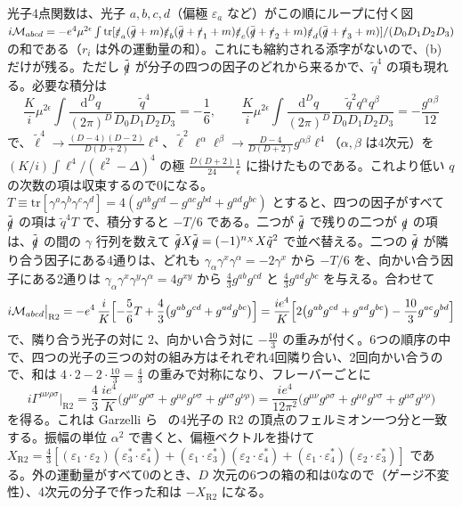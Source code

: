 \documentclass[a4paper,10pt]{ltjsarticle}
\newcommand{\dd}{\mathrm{d}}
\begin{document}
光子4点関数は、光子 $a,b,c,d$（偏極 $\varepsilon_a$ など）がこの順にループに付く図 $i\mathcal M_{abcd}=-e^4\mu^{2\epsilon}\int\mathrm{tr}[\slashed\varepsilon_a(\bar{\slashed q}+m)\slashed\varepsilon_b(\bar{\slashed q}+\slashed r_1+m)\slashed\varepsilon_c(\bar{\slashed q}+\slashed r_2+m)\slashed\varepsilon_d(\bar{\slashed q}+\slashed r_3+m)]/(D_0D_1D_2D_3)$ の和である（$r_i$ は外の運動量の和）。これにも縮約される添字がないので、(b) だけが残る。ただし $\tilde{\slashed q}$ が分子の四つの因子のどれから来るかで、$\tilde q^4$ の項も現れる。必要な積分は
\begin{equation*}
\frac Ki\mu^{2\epsilon}\int\frac{\dd^Dq}{(2\pi)^D}\frac{\tilde q^4}{D_0D_1D_2D_3}=-\frac16,\qquad
\frac Ki\mu^{2\epsilon}\int\frac{\dd^Dq}{(2\pi)^D}\frac{\tilde q^2q^\alpha q^\beta}{D_0D_1D_2D_3}=-\frac{g^{\alpha\beta}}{12}
\end{equation*}
で、$\tilde\ell^4\to\frac{(D-4)(D-2)}{D(D+2)}\ell^4$、$\tilde\ell^2\ell^\alpha\ell^\beta\to\frac{D-4}{D(D+2)}g^{\alpha\beta}\ell^4$（$\alpha,\beta$ は4次元）を $(K/i)\int\ell^4/(\ell^2-\Delta)^4$ の極 $\frac{D(D+2)}{24}\frac1\epsilon$ に掛けたものである。これより低い $q$ の次数の項は収束するので0になる。$T\equiv\mathrm{tr}[\gamma^a\gamma^b\gamma^c\gamma^d]=4(g^{ab}g^{cd}-g^{ac}g^{bd}+g^{ad}g^{bc})$ とすると、四つの因子がすべて $\tilde{\slashed q}$ の項は $\tilde q^4T$ で、積分すると $-T/6$ である。二つが $\tilde{\slashed q}$ で残りの二つが $\slashed q$ の項は、$\tilde{\slashed q}$ の間の $\gamma$ 行列を数えて $\tilde{\slashed q}X\tilde{\slashed q}=(-1)^{n_X}X\tilde q^2$ で並べ替える。二つの $\tilde{\slashed q}$ が隣り合う因子にある4通りは、どれも $\gamma_\alpha\gamma^x\gamma^\alpha=-2\gamma^x$ から $-T/6$ を、向かい合う因子にある2通りは $\gamma_\alpha\gamma^x\gamma^y\gamma^\alpha=4g^{xy}$ から $\frac43g^{ab}g^{cd}$ と $\frac43g^{ad}g^{bc}$ を与える。合わせて
\begin{equation*}
i\mathcal M_{abcd}\big|_{\mathrm{R2}}=-e^4\,\frac iK\Bigl[-\frac56T+\frac43\bigl(g^{ab}g^{cd}+g^{ad}g^{bc}\bigr)\Bigr]
=\frac{ie^4}{K}\Bigl[2\bigl(g^{ab}g^{cd}+g^{ad}g^{bc}\bigr)-\frac{10}{3}g^{ac}g^{bd}\Bigr]
\end{equation*}
で、隣り合う光子の対に $2$、向かい合う対に $-\frac{10}3$ の重みが付く。6つの順序の中で、四つの光子の三つの対の組み方はそれぞれ4回隣り合い、2回向かい合うので、和は $4\cdot2-2\cdot\frac{10}{3}=\frac43$ の重みで対称になり、フレーバーごとに
\begin{equation*}
i\Gamma^{\mu\nu\rho\sigma}\big|_{\mathrm{R2}}=\frac43\,\frac{ie^4}{K}\bigl(g^{\mu\nu}g^{\rho\sigma}+g^{\mu\rho}g^{\nu\sigma}+g^{\mu\sigma}g^{\nu\rho}\bigr)=\frac{ie^4}{12\pi^2}\bigl(g^{\mu\nu}g^{\rho\sigma}+g^{\mu\rho}g^{\nu\sigma}+g^{\mu\sigma}g^{\nu\rho}\bigr)
\end{equation*}
を得る。これは Garzelli ら~\cite{garzelli10} の4光子の R2 の頂点のフェルミオン一つ分と一致する。振幅の単位 $\alpha^2$ で書くと、偏極ベクトルを掛けて $X_{\mathrm{R2}}=\frac43[(\varepsilon_1\cdot\varepsilon_2)(\varepsilon_3^*\cdot\varepsilon_4^*)+(\varepsilon_1\cdot\varepsilon_3^*)(\varepsilon_2\cdot\varepsilon_4^*)+(\varepsilon_1\cdot\varepsilon_4^*)(\varepsilon_2\cdot\varepsilon_3^*)]$ である。外の運動量がすべて0のとき、$D$ 次元の6つの箱の和は0なので（ゲージ不変性）、4次元の分子で作った和は $-X_{\mathrm{R2}}$ になる。
\end{document}
